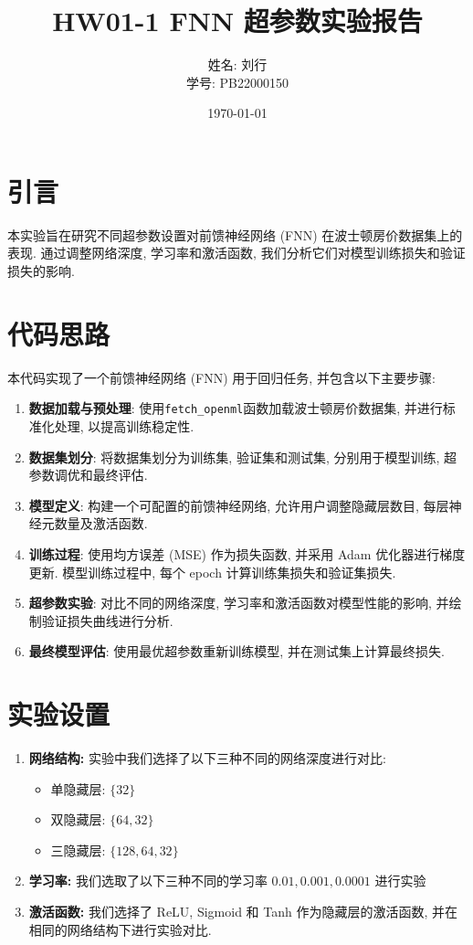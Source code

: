 \documentclass{article}
\title{HW01-1 FNN 超参数实验报告}
\author{姓名: 刘行\\学号: PB22000150}
\date{\today}
\begin{document}
\maketitle
	\section{引言}
		本实验旨在研究不同超参数设置对前馈神经网络 (FNN) 在波士顿房价数据集上的表现. 通过调整网络深度, 学习率和激活函数, 我们分析它们对模型训练损失和验证损失的影响.

	\section{代码思路}
		本代码实现了一个前馈神经网络 (FNN) 用于回归任务, 并包含以下主要步骤:

		\begin{enumerate}
			\item \textbf{数据加载与预处理}: 使用\texttt{fetch\_openml}函数加载波士顿房价数据集, 并进行标准化处理, 以提高训练稳定性.
			\item \textbf{数据集划分}: 将数据集划分为训练集, 验证集和测试集, 分别用于模型训练, 超参数调优和最终评估.
			\item \textbf{模型定义}: 构建一个可配置的前馈神经网络, 允许用户调整隐藏层数目, 每层神经元数量及激活函数.
			\item \textbf{训练过程}: 使用均方误差 (MSE) 作为损失函数, 并采用 Adam 优化器进行梯度更新. 模型训练过程中, 每个 epoch 计算训练集损失和验证集损失.
			\item \textbf{超参数实验}: 对比不同的网络深度, 学习率和激活函数对模型性能的影响, 并绘制验证损失曲线进行分析.
			\item \textbf{最终模型评估}: 使用最优超参数重新训练模型, 并在测试集上计算最终损失.
		\end{enumerate}

	\section{实验设置}
		\begin{enumerate}
			\item \textbf{网络结构: }实验中我们选择了以下三种不同的网络深度进行对比:

				\begin{itemize}
					\item 单隐藏层: $\{32\}$
					\item 双隐藏层: $\{64, 32\}$
					\item 三隐藏层: $\{128, 64, 32\}$
				\end{itemize}

			\item \textbf{学习率: }我们选取了以下三种不同的学习率 $0.01, 0.001, 0.0001$ 进行实验

			\item \textbf{激活函数: }我们选择了 ReLU, Sigmoid 和 Tanh 作为隐藏层的激活函数, 并在相同的网络结构下进行实验对比.
		\end{enumerate}
\end{document}
